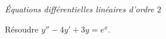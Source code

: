 \documentclass[a4paper,10pt]{report}
\begin{document}

\medskip

\begin{center}
\textit{{ {\large Équations différentielles linéaires d'ordre $2$}}}
\end{center}

\medskip

\begin{Exercice}{} Résoudre $y''-4y'+3y=e^x$.
\end{Exercice}
\end{document}
